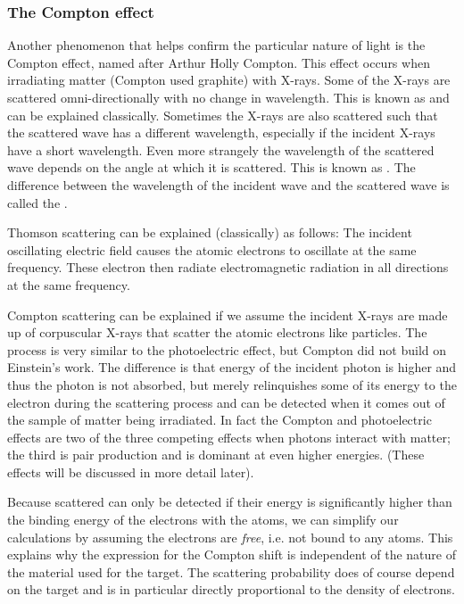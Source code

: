 \subsubsection{The Compton effect}
Another phenomenon that helps confirm the particular nature of light is the Compton effect, named after Arthur Holly Compton. This effect occurs when irradiating matter (Compton used graphite) with X-rays. Some of the X-rays are scattered omni-directionally with no change in wavelength. This is known as  and can be explained classically. Sometimes the X-rays are also scattered such that the scattered wave has a different wavelength, especially if the incident X-rays have a short wavelength. Even more strangely the wavelength of the scattered wave depends on the angle at which it is scattered. This is known as . The difference between the wavelength of the incident wave and the scattered wave is called the .

Thomson scattering can be explained (classically) as follows: The incident oscillating electric field causes the atomic electrons to oscillate at the same frequency. These electron then radiate electromagnetic radiation in all directions at the same frequency.

Compton scattering can be explained if we assume the incident X-rays are made up of corpuscular X-rays that scatter the atomic electrons like particles. The process is very similar to the photoelectric effect, but Compton did not build on Einstein's work. The difference is that energy of the incident photon is higher and thus the photon is not absorbed, but merely relinquishes some of its energy to the electron during the scattering process and can be detected when it comes out of the sample of matter being irradiated. In fact the Compton and photoelectric effects are two of the three competing effects when photons interact with matter; the third is pair production and is dominant at even higher energies. (These effects will be discussed in more detail later).

Because scattered can only be detected if their energy is significantly higher than the binding energy of the electrons with the atoms, we can simplify our calculations by assuming the electrons are \textit{free}, i.e. not bound to any atoms. This explains why the expression for the Compton shift is independent of the nature of the material used for the target. The scattering probability does of course depend on the target and is in particular directly proportional to the density of electrons.

